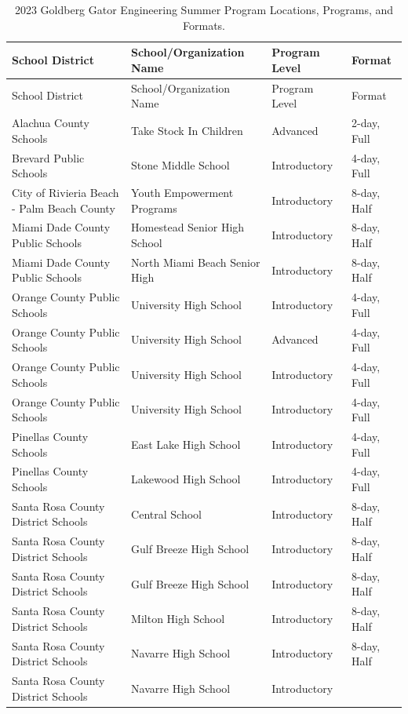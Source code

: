 \documentclass[
]{article}
\begin{document}
\begin{longtable}[]{@{}llll@{}}
\caption{2023 Goldberg Gator Engineering Summer Program Locations,
Programs, and Formats.}\tabularnewline
\toprule\noalign{}
School District & School/Organization Name & Program Level & Format \\
\midrule\noalign{}
\endfirsthead
\toprule\noalign{}
School District & School/Organization Name & Program Level & Format \\
\midrule\noalign{}
\endhead
\bottomrule\noalign{}
\endlastfoot
Alachua County Schools & Take Stock In Children & Advanced & 2-day,
Full \\
Brevard Public Schools & Stone Middle School & Introductory & 4-day,
Full \\
City of Rivieria Beach - Palm Beach County & Youth Empowerment Programs
& Introductory & 8-day, Half \\
Miami Dade County Public Schools & Homestead Senior High School &
Introductory & 8-day, Half \\
Miami Dade County Public Schools & North Miami Beach Senior High &
Introductory & 8-day, Half \\
Orange County Public Schools & University High School & Introductory &
4-day, Full \\
Orange County Public Schools & University High School & Advanced &
4-day, Full \\
Orange County Public Schools & University High School & Introductory &
4-day, Full \\
Orange County Public Schools & University High School & Introductory &
4-day, Full \\
Pinellas County Schools & East Lake High School & Introductory & 4-day,
Full \\
Pinellas County Schools & Lakewood High School & Introductory & 4-day,
Full \\
Santa Rosa County District Schools & Central School & Introductory &
8-day, Half \\
Santa Rosa County District Schools & Gulf Breeze High School &
Introductory & 8-day, Half \\
Santa Rosa County District Schools & Gulf Breeze High School &
Introductory & 8-day, Half \\
Santa Rosa County District Schools & Milton High School & Introductory &
8-day, Half \\
Santa Rosa County District Schools & Navarre High School & Introductory
& 8-day, Half \\
Santa Rosa County District Schools & Navarre High School & Introductory

\end{longtable}
\end{document}
